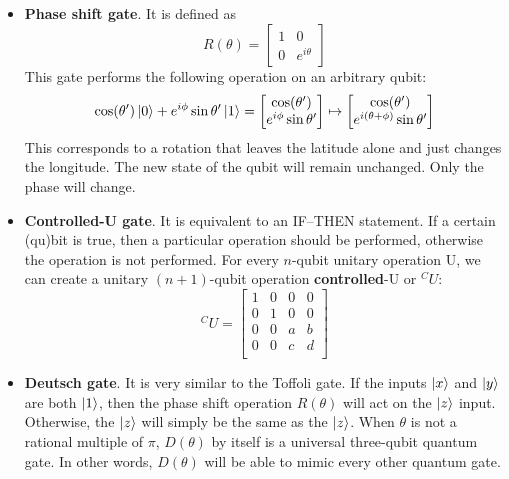 \documentclass{easyclass}
\begin{document}
\begin{itemize}
	\item \textbf{Phase shift gate}. It is defined as  
	\begin{equation}
		R(\theta)=\begin{bmatrix}
			1 & 0\\
			0 & e^{i\theta}
		\end{bmatrix}
	\end{equation}
	This gate performs the following operation on an arbitrary qubit:
	\begin{equation}
		\cos(\theta')\ket{0}+e^{i\phi}\sin{\theta'}\ket{1}=
		\begin{bmatrix}
			\cos(\theta')\\
			e^{i\phi}\sin{\theta'}
		\end{bmatrix}\mapsto
		\begin{bmatrix}
			\cos(\theta')\\
			e^{i(\theta+\phi)}\sin{\theta'}
		\end{bmatrix}
	\end{equation}
	This corresponds to a rotation that leaves the latitude alone and just changes the longitude. The new state of the qubit will remain unchanged. Only the phase will change.
	
	\item \textbf{Controlled-U gate}. It is equivalent to an IF–THEN statement. If a certain (qu)bit is true, then a particular operation should be performed, otherwise the operation is not
	performed. For every $n$-qubit unitary operation U, we can create a unitary $(n+1)$-qubit operation \textbf{controlled}-U or $^CU$:
	\begin{equation}
		^CU=
		\begin{bmatrix}
			1 & 0 & 0 & 0\\
			0 & 1 & 0 & 0\\
			0 & 0 & a & b\\
			0 & 0 & c & d\\
		\end{bmatrix}
	\end{equation}

	\item \textbf{Deutsch gate}. It is very similar to the Toffoli gate. If the inputs $\ket{x}$ and $\ket{y}$ are both $\ket{1}$, then the phase shift operation $R(\theta)$ will act on the $\ket{z}$ input. Otherwise, the $\ket{z}$ will simply be the same as the $\ket{z}$. When $\theta$ is not a rational multiple of $\pi$, $D(\theta)$ by itself is a universal three-qubit quantum gate. In other words, $D(\theta)$ will be able to mimic every other
	quantum gate.
\end{itemize}
\end{document}
